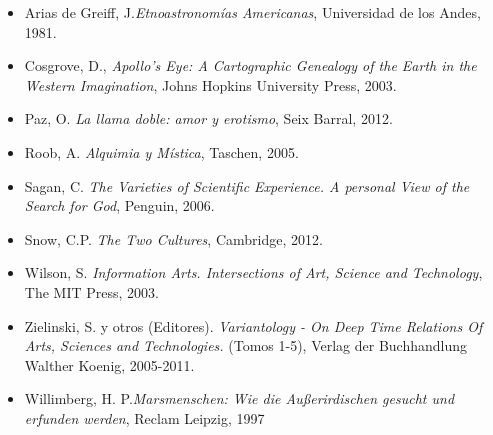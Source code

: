 \documentclass{report}
\begin{document}
\begin{itemize}

\item Arias de Greiff, J.\emph{Etnoastronom\'ias Americanas},
  Universidad de los Andes, 1981.

\item Cosgrove, D., \emph{Apollo's Eye: A Cartographic Genealogy of
  the Earth in the Western Imagination}, Johns Hopkins University
  Press, 2003.
\item Paz, O. \emph{La llama doble: amor y erotismo}, Seix Barral, 2012.
\item Roob, A. \emph{Alquimia y M\'istica}, Taschen, 2005.
\item Sagan, C. \emph{The Varieties of Scientific Experience. A personal View of the Search for God}, Penguin, 2006.
\item Snow, C.P. \emph{The Two Cultures}, Cambridge, 2012.
\item Wilson, S. \emph{Information Arts. Intersections of Art, Science
and Technology}, The MIT Press, 2003.
\item Zielinski, S. y otros (Editores). \emph{Variantology - On Deep Time
  Relations Of Arts, Sciences and Technologies.} (Tomos 1-5), Verlag
der Buchhandlung Walther Koenig, 2005-2011.

\item Willimberg, H. P.\emph{Marsmenschen:  Wie die Au\ss erirdischen
  gesucht und erfunden werden}, Reclam Leipzig, 1997

\end{itemize}
\end{document}
